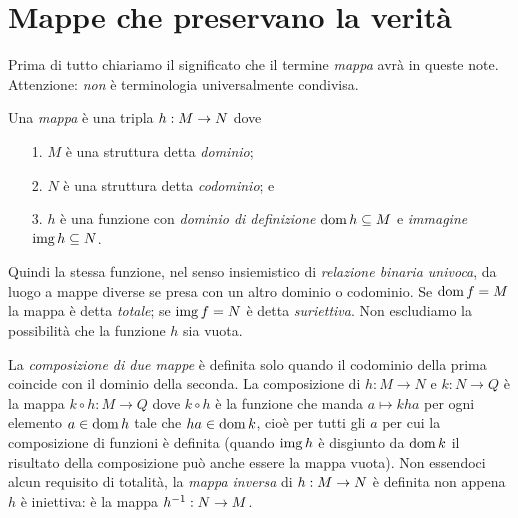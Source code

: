 \section{Mappe che preservano la verit\`a}

Prima di tutto chiariamo il significato che il termine \emph{mappa\/} avr\`a in queste note. Attenzione: \textit{non\/} \`e terminologia universalmente condivisa.

\begin{definition}\label{defmappa}
Una \emph{mappa\/} \`e una tripla $h:M\rightarrow N$ dove 
\begin{itemize}
\item[1.] $M$ \`e una struttura detta \emph{dominio};
\item[2.] $N$ \`e una struttura detta \emph{codominio}; e
\item[3.] $h$ \`e una funzione con \emph{dominio di definizione\/} $\mathop{\rm dom} h\subseteq M$ e \emph{immagine} $\mathop{\rm img} h\subseteq N$.\QED
\end{itemize}
\end{definition}

Quindi la stessa funzione, nel senso insiemistico di \textit{relazione binaria univoca}, da luogo a mappe diverse se presa con un altro dominio o codominio.  Se $\mathop{\rm dom} f=M$ la mappa \`e detta \emph{totale}; se $\mathop{\rm img} f=N$ \`e detta \emph{suriettiva}. Non escludiamo la possibilit\`a che la funzione $h$ sia vuota.

La \emph{composizione di due mappe\/} \`e definita solo quando il codominio della prima coincide con il dominio della seconda. La composizione di $h:M\to N$ e $k:N\to Q$ \`e la mappa $k\circ h:M\to Q$ dove $k\circ h$ \`e la funzione che manda $a\mapsto kha$ per ogni elemento $a\in\mathop{\rm dom} h$ tale che $ha\in\mathop{\rm dom} k$, cio\`e per tutti gli $a$ per cui la composizione di funzioni \`e definita (quando $\mathop{\rm img} h$ \`e disgiunto da $\mathop{\rm dom} k$ il risultato della composizione pu\`o anche essere la mappa vuota). Non essendoci alcun requisito di totalit\`a, la \emph{mappa inversa\/} di $h:M\rightarrow N$ \`e definita non appena $h$ \`e iniettiva: \`e la mappa $h^{-1}:N\rightarrow M$.

